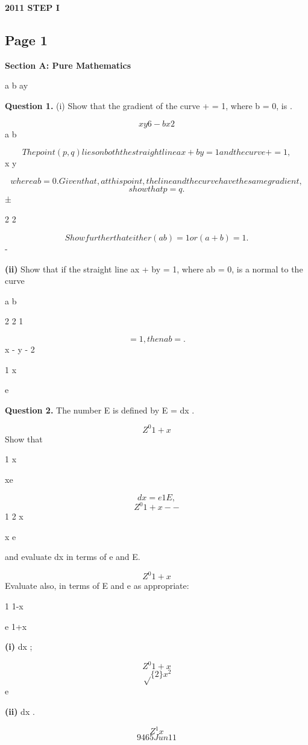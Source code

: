 \documentclass[12pt]{article}
\begin{document}
\begin{center}
{\Large \textbf{2011 STEP I}}
\end{center}

\subsection*{Page 1}
\begin{flushleft}
\bigskip\textbf{Section A: Pure Mathematics}\par
a b ay\par
\bigskip\textbf{Question 1.} (i) Show that the gradient of the curve + = 1, where b = 0, is .\par
\[x y 6 - bx2\]
a b\par
\[The point (p, q) lies on both the straight line ax + by = 1 and the curve + = 1 ,\]
x y\par
\[where ab = 0. Given that, at this point, the line and the curve have the same gradient,\]
\[show that p = q .\]
±\par
2 2\par
\[Show further that either (a b) = 1 or (a + b) = 1 .\]
-\par
\textbf{(ii)} Show that if the straight line ax + by = 1, where ab = 0, is a normal to the curve\par
a b\par
2 2 1\par
\[= 1, then a b = .\]
x - y - 2\par
1 x\par
e\par
\bigskip\textbf{Question 2.} The number E is defined by E = dx .\par
\[Z^0 1 + x\]
Show that\par
1 x\par
xe\par
\[dx = e 1 E ,\]
\[Z^0 1 + x - -\]
1 2 x\par
x e\par
and evaluate dx in terms of e and E.\par
\[Z^0 1 + x\]
Evaluate also, in terms of E and e as appropriate:\par
1 1-x\par
e 1+x\par
\textbf{(i)} dx ;\par
\[Z^0 1 + x\]
\[\sqrt\{2\} x^2\]
e\par
\textbf{(ii)} dx .\par
\[Z^1 x\]
\[9465 Jun11\]
\end{flushleft}
\end{document}
